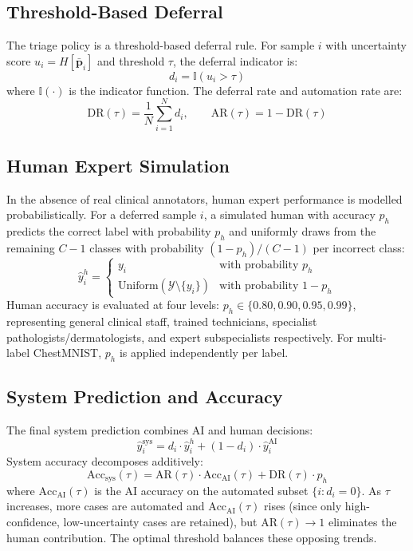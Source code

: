 \subsection{Threshold-Based Deferral}

The triage policy is a threshold-based deferral rule. For sample $i$ with uncertainty score $u_i = H[\bar{\mathbf{p}}_i]$ and threshold $\tau$, the deferral indicator is:
\begin{equation}
    d_i = \mathbb{I}(u_i > \tau)
\end{equation}
where $\mathbb{I}(\cdot)$ is the indicator function. The deferral rate and automation rate are:
\begin{equation}
    \text{DR}(\tau) = \frac{1}{N}\sum_{i=1}^{N} d_i, \qquad \text{AR}(\tau) = 1 - \text{DR}(\tau)
\end{equation}

\subsection{Human Expert Simulation}

In the absence of real clinical annotators, human expert performance is modelled probabilistically. For a deferred sample $i$, a simulated human with accuracy $p_h$ predicts the correct label with probability $p_h$ and uniformly draws from the remaining $C-1$ classes with probability $(1-p_h)/(C-1)$ per incorrect class:
\begin{equation}
    \hat{y}_i^h = \begin{cases} y_i & \text{with probability } p_h \\ \text{Uniform}(\mathcal{Y} \setminus \{y_i\}) & \text{with probability } 1 - p_h \end{cases}
\end{equation}
Human accuracy is evaluated at four levels: $p_h \in \{0.80, 0.90, 0.95, 0.99\}$, representing general clinical staff, trained technicians, specialist pathologists/dermatologists, and expert subspecialists respectively. For multi-label ChestMNIST, $p_h$ is applied independently per label.

\subsection{System Prediction and Accuracy}

The final system prediction combines AI and human decisions:
\begin{equation}
    \hat{y}_i^{\text{sys}} = d_i \cdot \hat{y}_i^h + (1 - d_i) \cdot \hat{y}_i^{\text{AI}}
\end{equation}
System accuracy decomposes additively:
\begin{equation}
    \text{Acc}_{\text{sys}}(\tau) = \text{AR}(\tau) \cdot \text{Acc}_{\text{AI}}(\tau) + \text{DR}(\tau) \cdot p_h
\end{equation}
where $\text{Acc}_{\text{AI}}(\tau)$ is the AI accuracy on the automated subset $\{i : d_i = 0\}$. As $\tau$ increases, more cases are automated and $\text{Acc}_{\text{AI}}(\tau)$ rises (since only high-confidence, low-uncertainty cases are retained), but $\text{AR}(\tau) \to 1$ eliminates the human contribution. The optimal threshold balances these opposing trends.

